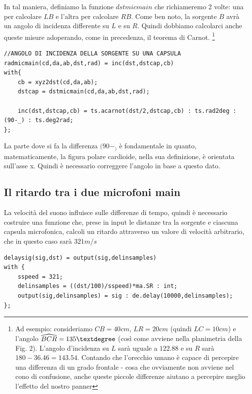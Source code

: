 \documentclass{article}
\begin{document}
    In tal maniera, definiamo la funzione $dstmicmain$ che richiameremo 2 volte: una per calcolare $LB$ e l'altra per calcolare $RB$.
    Come ben noto, la sorgente $B$ avrà un angolo di incidenza differente su $L$ e su $R$. Quindi dobbiamo calcolarci anche queste misure adoperando, come in precedenza, il teorema di Carnot.
    \footnote{Ad esempio: consideriamo $CB = 40 cm$, $LR = 20cm$ (quindi $LC=10cm$) e l'angolo $\widehat{BCR} = 135\textdegree$ (così come avviene nella planimetria della Fig. 2). L'angolo d'incidenza su $L$ sarà uguale a $122.88$ e su $R$ sarà $180-36.46=143.54$. Contando che l'orecchio umano è capace di percepire una differenza di un grado frontale - cosa che ovviamente non avviene nel cono di confusione, anche queste piccole differenze aiutano a percepire meglio l'effetto del nostro panner}
    
    \begin{lstlisting}
//ANGOLO DI INCIDENZA DELLA SORGENTE SU UNA CAPSULA
radmicmain(cd,da,ab,dst,rad) = inc(dst,dstcap,cb)
with{
    cb = xyz2dst(cd,da,ab);
    dstcap = dstmicmain(cd,da,ab,dst,rad);
    
    inc(dst,dstcap,cb) = ts.acarnot(dst/2,dstcap,cb) : ts.rad2deg : (90-_) : ts.deg2rad;
};
    \end{lstlisting}

    La parte dove si fa la differenza $(90-_)$ è fondamentale in quanto, matematicamente, la figura polare cardioide, nella sua definizione, è orientata sull'asse x. Quindi è necessario correggere l'angolo in base a questo dato.\\
\subsection{Il ritardo tra i due microfoni main}
    La velocità del suono influisce sulle differenze di tempo, quindi è necessario costruire una funzione che, prese in input le distanze tra la sorgente e ciascuna capsula microfonica, calcoli un ritardo attraverso un valore di velocità arbitrario, che in questo caso sarà $321 m/s$

    \begin{lstlisting}
delaysig(sig,dst) = output(sig,delinsamples)
with {
    sspeed = 321;
    delinsamples = ((dst/100)/sspeed)*ma.SR : int;
    output(sig,delinsamples) = sig : de.delay(10000,delinsamples);
};
    \end{lstlisting}
    
\end{document}
